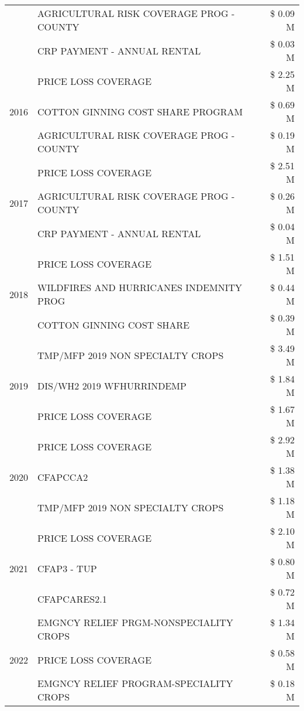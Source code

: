 \begin{tabular}{llr}
 & AGRICULTURAL RISK COVERAGE PROG - COUNTY & \$ 0.09 M \\
 & CRP PAYMENT - ANNUAL RENTAL & \$ 0.03 M \\
\cline{1-3}
\multirow[t]{3}{*}{2016} & PRICE LOSS COVERAGE & \$ 2.25 M \\
 & COTTON GINNING COST SHARE PROGRAM & \$ 0.69 M \\
 & AGRICULTURAL RISK COVERAGE PROG - COUNTY & \$ 0.19 M \\
\cline{1-3}
\multirow[t]{3}{*}{2017} & PRICE LOSS COVERAGE & \$ 2.51 M \\
 & AGRICULTURAL RISK COVERAGE PROG - COUNTY & \$ 0.26 M \\
 & CRP PAYMENT - ANNUAL RENTAL & \$ 0.04 M \\
\cline{1-3}
\multirow[t]{3}{*}{2018} & PRICE LOSS COVERAGE & \$ 1.51 M \\
 & WILDFIRES AND HURRICANES INDEMNITY PROG & \$ 0.44 M \\
 & COTTON GINNING COST SHARE & \$ 0.39 M \\
\cline{1-3}
\multirow[t]{3}{*}{2019} & TMP/MFP 2019 NON SPECIALTY CROPS & \$ 3.49 M \\
 & DIS/WH2 2019 WFHURRINDEMP & \$ 1.84 M \\
 & PRICE LOSS COVERAGE & \$ 1.67 M \\
\cline{1-3}
\multirow[t]{3}{*}{2020} & PRICE LOSS COVERAGE & \$ 2.92 M \\
 & CFAPCCA2 & \$ 1.38 M \\
 & TMP/MFP 2019 NON SPECIALTY CROPS & \$ 1.18 M \\
\cline{1-3}
\multirow[t]{3}{*}{2021} & PRICE LOSS COVERAGE & \$ 2.10 M \\
 & CFAP3 - TUP & \$ 0.80 M \\
 & CFAPCARES2.1 & \$ 0.72 M \\
\cline{1-3}
\multirow[t]{3}{*}{2022} & EMGNCY RELIEF PRGM-NONSPECIALITY CROPS & \$ 1.34 M \\
 & PRICE LOSS COVERAGE & \$ 0.58 M \\
 & EMGNCY RELIEF PROGRAM-SPECIALITY CROPS & \$ 0.18 M \\
\cline{1-3}
\bottomrule
\end{tabular}
